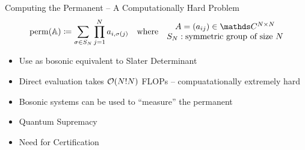 
\begin{frame}[t,plain]
\titlepage
\end{frame}


\begin{frame}{Computing the Permanent -- A Computationally Hard Problem}
%
\begin{align*}
	\perm(\mathbb{A})
&\coloneqq
	\sum_{\sigma \in S_N} \prod_{j=1}^{N} a_{i, \sigma(j)}
&&
	\text{where}
&
	\mqty{
		A = (a_{ij}) \in \setComplex^{N \times N} \\
		S_N : \text{symmetric group of size } N \\
	}
\end{align*}
%
\begin{itemize}
\item Use as bosonic equivalent to Slater Determinant
\item Direct evaluation takes $\mathcal{O}(N!N)$ FLOPs -- compuatationally extremely hard
\item[\Thus] Bosonic systems can be used to \enquote{measure} the permanent
\item[\Thus] Quantum Supremacy
\item Need for Certification
\end{itemize}
%
\end{frame}


